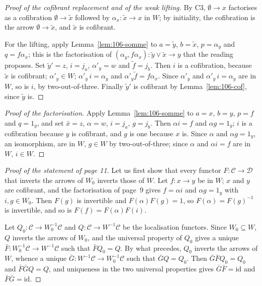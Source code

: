 \documentclass[11pt]{article}
\theoremstyle{plain}
\theoremstyle{definition}
\theoremstyle{remark}
\begin{document}
\begin{proof}[Proof of the cofibrant replacement and of the weak lifting]
By C3, $\emptyset \to x$ factorises as a cofibration $\emptyset \to \widetilde x$ followed by $\alpha_x : \widetilde x \to x$ in $W$; by initiality, the cofibration is the arrow $\emptyset \to \widetilde x$, and $\widetilde x$ is cofibrant.

For the lifting, apply Lemma~\ref{lem:106-somme} to $a = \widetilde y$, $b = \widetilde x$, $p = \alpha_y$ and $q = f \alpha_x$; this is the factorisation of $(\alpha_y, f\alpha_x) : \widetilde y \vee \widetilde x \to y$ that the reading proposes. Set $\widetilde y' = z$, $i = j_a$, $\alpha'_y = w$ and $\widetilde f = j_b$. Then $i$ is a cofibration, because $\widetilde x$ is cofibrant; $\alpha'_y \in W$; $\alpha'_y\, i = \alpha_y$ and $\alpha'_y \widetilde f = f\alpha_x$. Since $\alpha'_y$ and $\alpha'_y\, i = \alpha_y$ are in $W$, so is $i$, by two-out-of-three. Finally $\widetilde y'$ is cofibrant by Lemma~\ref{lem:106-cof}, since $\widetilde y$ is.
\end{proof}

\begin{proof}[Proof of the factorisation]
Apply Lemma~\ref{lem:106-somme} to $a = x$, $b = y$, $p = f$ and $q = 1_y$, and set $\bar x = z$, $\alpha = w$, $i = j_a$, $g = j_b$. Then $\alpha i = f$ and $\alpha g = 1_y$; $i$ is a cofibration because $y$ is cofibrant, and $g$ is one because $x$ is. Since $\alpha$ and $\alpha g = 1_y$, an isomorphism, are in $W$, $g \in W$ by two-out-of-three; since $\alpha$ and $\alpha i = f$ are in $W$, $i \in W$.
\end{proof}

\begin{proof}[Proof of the statement of page 11]
Let us first show that every functor $F : \mathcal C \to \mathcal D$ that inverts the arrows of $W_0$ inverts those of $W$. Let $f : x \to y$ be in $W$; $x$ and $y$ are cofibrant, and the factorisation of page~9 gives $f = \alpha i$ and $\alpha g = 1_y$ with $i, g \in W_0$. Then $F(g)$ is invertible and $F(\alpha) F(g) = 1$, so $F(\alpha) = F(g)^{-1}$ is invertible, and so is $F(f) = F(\alpha) F(i)$.

Let $Q_0 : \mathcal C \to W_0^{-1}\mathcal C$ and $Q : \mathcal C \to W^{-1}\mathcal C$ be the localisation functors. Since $W_0 \subseteq W$, $Q$ inverts the arrows of $W_0$, and the universal property of $Q_0$ gives a unique $\bar F : W_0^{-1}\mathcal C \to W^{-1}\mathcal C$ such that $\bar F Q_0 = Q$. By what precedes, $Q_0$ inverts the arrows of $W$, whence a unique $\bar G : W^{-1}\mathcal C \to W_0^{-1}\mathcal C$ such that $\bar G Q = Q_0$. Then $\bar G \bar F Q_0 = Q_0$ and $\bar F \bar G Q = Q$, and uniqueness in the two universal properties gives $\bar G \bar F = \mathrm{id}$ and $\bar F \bar G = \mathrm{id}$.
\end{proof}
\end{document}
